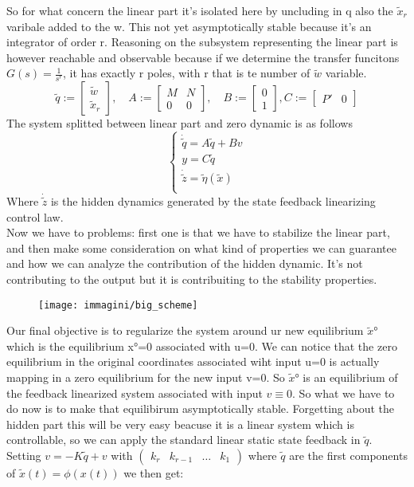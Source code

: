 So for what concern the linear part it's isolated here by uncluding in q also the $\tilde{x}_r$ varibale added to the w. This not yet asymptotically stable because it's an integrator of order r. Reasoning on the subsystem representing the linear part is however reachable and observable because if we determine the transfer funcitons $G(s)=\frac{1}{s^r}$, it has exactly r poles, with r that is  te number of $\tilde{w}$ variable.
\[
\tilde{q}:=\begin{bmatrix}
	\tilde{w}\\
	\tilde{x}_r
\end{bmatrix}, \quad A:= \begin{bmatrix}
M & N \\
0 & 0
\end{bmatrix}, \quad B:=\begin{bmatrix}
0 \\
1
\end{bmatrix}, C:=\begin{bmatrix}
P' & 0
\end{bmatrix}
\]The system splitted between linear part and zero dynamic is as follows
\begin{equation*}
	\left\{
	\begin{array}{ll}	
		\dot{\tilde{q}}=A\tilde{q}+Bv\\
		y=C\tilde{q}\\
		\boxed{\dot{\tilde{z}}=\tilde{\eta}(\tilde{x})}\\
	\end{array}
	\right.
\end{equation*} Where $\dot{\tilde{z}}$ is the hidden dynamics generated by the state feedback linearizing control law.\\Now we have to problems: first one is that we have to stabilize the linear part, and then make some consideration on what kind of properties we can guarantee and how we can analyze the contribution of the hidden dynamic. It's not contributing to the output but it is contribuiting to the stability properties.
\begin{figure}[H]
	\centering
	\texttt{[image: immagini/big\_scheme]}
	\caption{}
	\label{fig:bigscheme}
\end{figure}
Our final objective is to regularize the system around ur new equilibrium $\tilde{x}°$ which is the equilibrium x°=0 associated with u=0. We can notice that the zero equilibrium in the original coordinates associated wiht input u=0 is actually mapping
in a zero equilibrium for the new input v=0. So $\tilde{x}°$ is an equilibrium of the feedback linearized system associated with input $v \equiv 0$. So what we have to do now is to make that equilibirum asymptotically stable. Forgetting about the hidden part this will be very easy beacuse it is a linear system which is controllable, so we can apply the standard linear static state feedback in $\tilde{q}$. Setting $v=-K\tilde{q}+v$ with $\begin{pmatrix}
	k_r & k_{r-1} & \dots & k_1
\end{pmatrix}$ where $\tilde{q}$ are the first components of $\tilde{x}(t)=\phi(x(t))$ we then get: 
